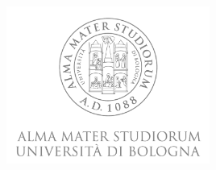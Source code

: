 \documentclass[a4paper,12pt,oneside]{book}
\begin{document}
	



\pagestyle{myheadings}


\thispagestyle{empty}  
                                               

\begin{center}
	\includegraphics[width=0.5\textwidth]{Logo_unibo.png}
\end{center}
\end{document}
